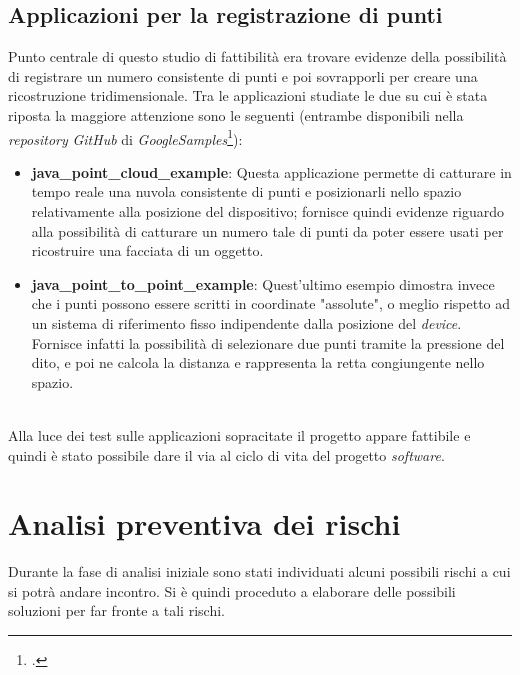 \subsection{Applicazioni per la registrazione di punti}
Punto centrale di questo studio di fattibilità era trovare evidenze della possibilità di registrare un numero consistente di punti e poi sovrapporli per creare una ricostruzione tridimensionale.
Tra le applicazioni studiate le due su cui è stata riposta la maggiore attenzione sono le seguenti (entrambe disponibili nella \emph{repository} \emph{GitHub} di \emph{GoogleSamples}\footcite{site: https://github.com/googlesamples/tango-examples-java/tree/master}):
\begin{itemize}
	\item \textbf{java\_point\_cloud\_example}: Questa applicazione permette di catturare in tempo reale una nuvola consistente di punti e posizionarli nello spazio relativamente alla posizione del dispositivo; fornisce quindi evidenze riguardo alla possibilità di catturare un numero tale di punti da poter essere usati per ricostruire una facciata di un oggetto.
	\item \textbf{java\_point\_to\_point\_example}: Quest'ultimo esempio dimostra invece che i punti possono essere scritti in coordinate "assolute", o meglio rispetto ad un sistema di riferimento fisso indipendente dalla posizione del \emph{device}. Fornisce infatti la possibilità di selezionare due punti tramite la pressione del dito, e poi ne calcola la distanza e rappresenta la retta congiungente nello spazio.
\end{itemize}
\ \\
Alla luce dei test sulle applicazioni sopracitate il progetto appare fattibile e quindi è stato possibile dare il via al ciclo di vita del progetto \emph{software}.


\section{Analisi preventiva dei rischi}

Durante la fase di analisi iniziale sono stati individuati alcuni possibili rischi a cui si potrà andare incontro.
Si è quindi proceduto a elaborare delle possibili soluzioni per far fronte a tali rischi.\\

